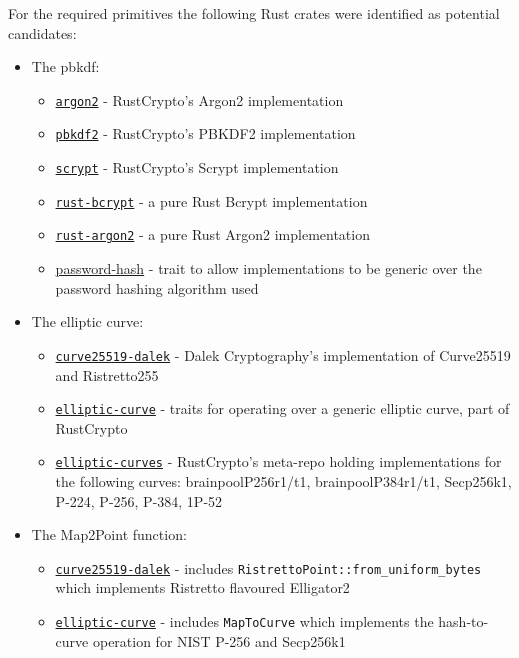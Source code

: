 For the required primitives the following Rust crates were identified as potential candidates:
\begin{itemize}
  \item{
    The \gls{pbkdf}:
    \begin{itemize}
      \item{\href{https://github.com/RustCrypto/password-hashes/tree/master/argon2}{\texttt{argon2}} - RustCrypto's Argon2 implementation}
      \item{\href{https://github.com/RustCrypto/password-hashes/tree/master/pbkdf2}{\texttt{pbkdf2}} - RustCrypto's PBKDF2 implementation}
      \item{\href{https://github.com/RustCrypto/password-hashes/tree/master/scrypt}{\texttt{scrypt}} - RustCrypto's Scrypt implementation}
      \item{\href{https://github.com/Keats/rust-bcrypt}{\texttt{rust-bcrypt}} - a pure Rust Bcrypt implementation}
      \item{\href{https://github.com/sru-systems/rust-argon2}{\texttt{rust-argon2}} - a pure Rust Argon2 implementation}
      \item{\href{https://github.com/RustCrypto/traits/tree/master/password-hash}{password-hash} - trait to allow implementations to be generic over the password hashing algorithm used}
    \end{itemize}
  }

  \item{
    The elliptic curve:
    \begin{itemize}
      \item{\href{https://github.com/dalek-cryptography/curve25519-dalek}{\texttt{curve25519-dalek}} - Dalek Cryptography's implementation of Curve25519 and Ristretto255 \cite{ristretto255}}
      \item{\href{https://github.com/RustCrypto/traits/tree/master/elliptic-curve}{\texttt{elliptic-curve}} - traits for operating over a generic elliptic curve, part of RustCrypto}
      \item{\href{https://github.com/RustCrypto/elliptic-curves}{\texttt{elliptic-curves}} - RustCrypto's meta-repo holding implementations for the following curves: brainpoolP256r1/t1, brainpoolP384r1/t1, Secp256k1, P-224, P-256, P-384, 1P-52}
    \end{itemize}
  }

  \item{
    The \textsf{Map2Point} function:
    \begin{itemize}
      \item{\href{https://github.com/dalek-cryptography/curve25519-dalek}{\texttt{curve25519-dalek}} - includes \verb|RistrettoPoint::from_uniform_bytes| which implements Ristretto flavoured Elligator2}
      \item{\href{https://github.com/RustCrypto/traits/tree/master/elliptic-curve}{\texttt{elliptic-curve}} - includes \texttt{MapToCurve} which implements the hash-to-curve operation for NIST P-256 and Secp256k1}
    \end{itemize}
  }


\end{itemize}
